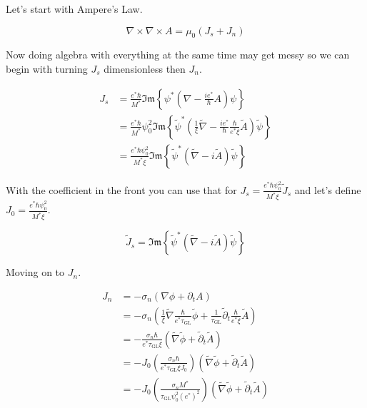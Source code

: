 \documentclass[11pt]{article}
\theoremstyle{definition}
\renewcommand{\Im}{\mathfrak{Im}}
\begin{document}
Let's start with Ampere's Law.

\begin{equation}
\label{eq:ampere-gaussian}
\nabla \times \nabla \times A = \mu_0 (J_s + J_n)
\end{equation}

Now doing algebra with everything at the same time may get messy so we can begin with turning $J_s$ dimensionless then $J_n$.

\begin{align}
J_s &= \frac{e^* \hbar}{M^*} \Im\!\left\{ \psi^* (\nabla - \frac{i e^*}{\hbar} A) \psi \right\} \label{eq:Js-dim-1}\\
&= \frac{e^* \hbar}{M^*} \psi^2_0 \Im\!\left\{ \tilde{\psi}^* (\frac{1}{\xi} \tilde{\nabla} - \frac{i e^*}{\hbar} \frac{\hbar}{e^* \xi} \tilde{A}) \tilde{\psi} \right\} \label{eq:Js-dim-2}\\
&= \frac{e^* \hbar \psi^2_0}{M^*\xi} \Im\!\left\{ \tilde{\psi}^* ( \tilde{\nabla} - i \tilde{A} ) \tilde{\psi} \right\} \label{eq:Js-dim-3}
\end{align}

With the coefficient in the front you can use that for $J_s = \frac{e^* \hbar \psi^2_0}{M^*\xi} \tilde{J}_s$ and let's define $J_0 = \frac{e^* \hbar \psi^2_0}{M^*\xi}$.

\begin{equation}
\label{eq:Js-tilde}
\tilde{J}_s = \Im\!\left\{ \tilde{\psi}^* ( \tilde{\nabla} - i \tilde{A} ) \tilde{\psi} \right\}
\end{equation}

Moving on to $J_n$.

\begin{align}
J_n &= -\sigma_n (\nabla \phi + \partial_t A) \label{eq:Jn-dim-1}\\
&= -\sigma_n (\frac{1}{\xi} \tilde{\nabla} \frac{\hbar}{e^* \tau_{\mathrm{GL}}} \tilde{\phi} + \frac{1}{\tau_{\mathrm{GL}}} \tilde{\partial}_t \frac{\hbar}{e^* \xi} \tilde{A}) \label{eq:Jn-dim-2}\\
&= - \frac{\sigma_n \hbar}{e^* \tau_{\mathrm{GL}} \xi} (\tilde{\nabla} \tilde{\phi} + \tilde{\partial}_t \tilde{A}) \label{eq:Jn-dim-3}\\
&= - J_0 (\frac{\sigma_n \hbar}{e^* \tau_{\mathrm{GL}} \xi J_0}) (\tilde{\nabla} \tilde{\phi} + \tilde{\partial}_t \tilde{A}) \label{eq:Jn-dim-4}\\
&= - J_0 (\frac{\sigma_n M^*}{\tau_{\mathrm{GL}} \psi_0^2 (e^*)^2}) (\tilde{\nabla} \tilde{\phi} + \tilde{\partial}_t \tilde{A}) \label{eq:Jn-dim-5}
\end{align}
\end{document}
